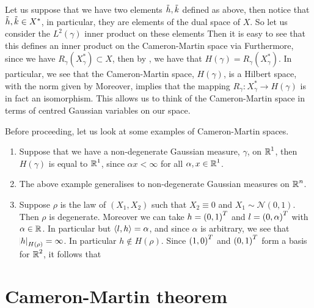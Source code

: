 \documentclass[../main.tex]{subfiles}
\begin{document}
Let us suppose that we have two elements $\Tilde{h},\Tilde{k}$ defined as above, then notice that $\Tilde{h},\Tilde{k}\in X^*$, in particular, they are elements of the dual space of $X$. So let us consider the $L^2(\gamma)$ inner product on these elements
 Then it is easy to see that this defines an inner product on the Cameron-Martin space via  Furthermore, since we have $R_\gamma(X_\gamma^*)\subset X$, then by , we have that $H(\gamma) = R_\gamma(X_\gamma^*)$. In particular, we see that the Cameron-Martin space, $H(\gamma)$, is a Hilbert space, with the norm given by  Moreover,  implies that the mapping $R_\gamma:X_\gamma^*\to H(\gamma)$ is in fact an isomorphism. This allows us to think of the Cameron-Martin space in terms of centred Gaussian variables on our space.

\begin{example}
Before proceeding, let us look at some examples of Cameron-Martin spaces.
\begin{enumerate}
    \item Suppose that we have a non-degenerate Gaussian measure, $\gamma$, on $\operatorname{\mathbb{R}}^1$, then $H(\gamma)$ is equal to $\operatorname{\mathbb{R}}^1$, since $\alpha x<\infty$ for all $\alpha,x\in\operatorname{\mathbb{R}}^1$.
    \item The above example generalises to non-degenerate Gaussian measures on $\operatorname{\mathbb{R}}^n$.
    \item Suppose $\rho$ is the law of $(X_1,X_2)$ such that $X_2 \equiv 0$ and $X_1\sim\mathcal{N}(0,1)$. Then $\rho$ is degenerate. Moreover we can take $h = \del{0,1}^T$ and $l = \del{0,\alpha}^T$ with $\alpha\in\operatorname{\mathbb{R}}$. In particular  but $\left\langle l,h \right\rangle = \alpha$, and since $\alpha$ is arbitrary, we see that $\abs{h}_{H(\rho)} = \infty$. In particular $h\notin H(\rho)$. Since $\del{1,0}^T$ and $\del{0,1}^T$ form a basis for $\operatorname{\mathbb{R}}^2$, it follows that 
\end{enumerate}
\end{example}

\section{Cameron-Martin theorem}
\end{document}
